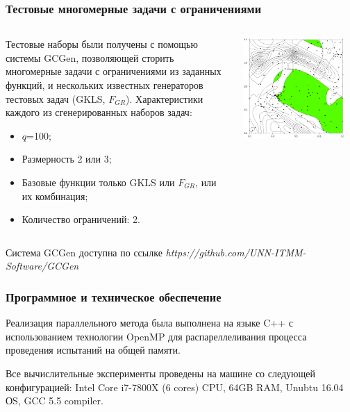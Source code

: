 \documentclass[aspectratio=1610]{beamer}
\begin{document}
\begin{frame}
  \frametitle{Тестовые многомерные задачи с ограничениями}
  \begin{columns}
    \begin{column}{0.5\textwidth}
      Тестовые наборы были получены с помощью системы GCGen, позволяющей
      сторить многомерные задачи с ограничениями из заданных функций, и нескольких
      известных генераторов тестовых задач (GKLS, \(F_{GR}\)).
      Характеристики каждого из сгенерированных наборов задач:
      \begin{itemize}
        \item \(q\)=100;
        \item Размерность 2 или 3;
        \item Базовые функции только GKLS или \(F_{GR}\), или их комбинация;
        \item Количество ограничений: 2.
      \end{itemize}
    \end{column}
    \begin{column}{0.5\textwidth}
      \centerline{\includegraphics[width=0.9\textwidth]{4.png}}
    \end{column}
  \end{columns}
  \footnotesize{Система GCGen доступна по ссылке \textit{https://github.com/UNN-ITMM-Software/GCGen}}
\end{frame}

\begin{frame}
  \frametitle{Программное и техническое обеспечение}
  \begin{center}
    Реализация параллельного метода была выполнена на языке C++ с использованием технологии OpenMP
    для распареллеливания процесса проведения испытаний на общей памяти.

    Все вычислительные
    эксперименты проведены на машине со следующей конфигурацией: Intel Core i7-7800X (6 cores) CPU, 64GB RAM, Unubtu 16.04 ОS, GCC 5.5 compiler.
  \end{center}
\end{frame}
\end{document}
